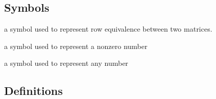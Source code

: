 \documentclass[a4paper,12pt]{article}
\theoremstyle{definition}
\theoremstyle{definition}
\begin{document}
	\subsection{Symbols}
	\begin{description}[style=nextline]
		\item[$\sim$] a symbol used to represent row equivalence between two matrices.
		
		\item[$\blacksquare$] a symbol used to represent a nonzero number
		
		\item[*] a symbol used to represent any number
	\end{description}
	
	\subsection{Definitions}
\end{document}
